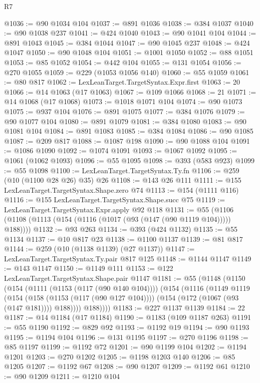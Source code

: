 \begin{lexlean}{R7}
\begin{coremodule}
@1036 := @90 @1034 @104
@1037 := @891 @1036
@1038 := @384 @1037
@1040 := @90 @1038 @237
@1041 := @424 @1040
@1043 := @90 @1041 @104
@1044 := @891 @1043
@1045 := @384 @1044
@1047 := @90 @1045 @237
@1048 := @424 @1047
@1050 := @90 @1048 @104
@1051 := @1001 @1050
@1052 := @88 @1051
@1053 := @85 @1052
@1054 := @442 @104
@1055 := @131 @1054
@1056 := @270 @1055
@1059 := @229 (@1053 @1056 @140)
@1060 := @55 @1059
@1061 := @80 @817
@1062 := LexLeanTarget.TargetSyntax.Expr.first
@1063 := 20
@1066 := @14 @1063 (@17 @1063)
@1067 := @109 @1066
@1068 := 21
@1071 := @14 @1068 (@17 @1068)
@1073 := @1018 @1071 @104
@1074 := @90 @1073
@1075 := @937 @104
@1076 := @891 @1075
@1077 := @384 @1076
@1079 := @90 @1077 @104
@1080 := @891 @1079
@1081 := @384 @1080
@1083 := @90 @1081 @104
@1084 := @891 @1083
@1085 := @384 @1084
@1086 := @90 @1085
@1087 := @209 @817
@1088 := @1087 @198
@1090 := @90 @1088 @104
@1091 := @1086 @1090
@1092 := @1074 @1091
@1093 := @1067 @1092
@1095 := @1061 (@1062 @1093)
@1096 := @55 @1095
@1098 := @393 (@583 @923)
@1099 := @55 @1098
@1100 := LexLeanTarget.TargetSyntax.Ty.fn
@1106 := @259 (@10 (@1100 @28 @26) @35) @26
@1108 := @143 @26 @111
@1111 := @155 LexLeanTarget.TargetSyntax.Shape.zero @74
@1113 := @154 (@1111 @116)
@1116 := @155 LexLeanTarget.TargetSyntax.Shape.succ @75
@1119 := LexLeanTarget.TargetSyntax.Expr.apply @92 @118
@1131 := @55 (@1106 (@1108 (@1113 (@154 (@1116 (@1017 (@93 (@147 (@90 @1119 @104))))) @188))))
@1132 := @93 @263
@1134 := @393 (@424 @1132)
@1135 := @55 @1134
@1137 := @10 @817 @23
@1138 := @1100 @1137
@1139 := @81 @817
@1144 := @259 (@10 (@1138 @1139) (@27 @1137))
@1147 := LexLeanTarget.TargetSyntax.Ty.pair @817 @125
@1148 := @1144 @1147
@1149 := @143 @1147
@1150 := @1149 @111
@1153 := @122 LexLeanTarget.TargetSyntax.Shape.pair @1147
@1181 := @55
    (@1148
      (@1150
        (@154
          (@1111 (@1153 (@117 (@90 @140 @104))))
          (@154
            (@1116
              (@1149
                @1119
                (@154
                  (@158 (@1153 (@117 (@90 @127 @104))))
                  (@154 (@172 (@1067 (@93 (@147 @181)))) @188))))
            @188))))
@1183 := @227 @1137 @1139
@1184 := 22
@1187 := @14 @1184 (@17 @1184)
@1190 := @1183 (@109 @1187 @263)
@1191 := @55 @1190
@1192 := @829 @92
@1193 := @1192 @19
@1194 := @90 @1193
@1195 := @1194 @104
@1196 := @131 @1195
@1197 := @270 @1196
@1198 := @85 @1197
@1199 := @1192 @72
@1201 := @90 @1199 @104
@1202 := @1194 @1201
@1203 := @270 @1202
@1205 := @1198 @1203 @140
@1206 := @85 @1205
@1207 := @1192 @67
@1208 := @90 @1207
@1209 := @1192 @61
@1210 := @90 @1209
@1211 := @1210 @104

\end{coremodule}
\end{lexlean}
